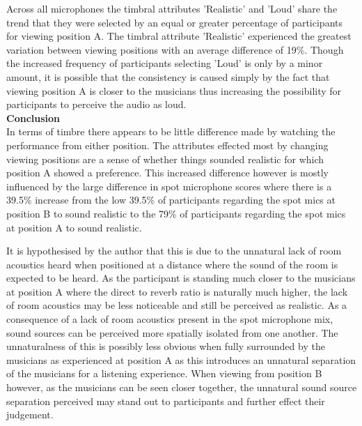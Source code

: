 
	Across all microphones the timbral attributes 'Realistic' and 'Loud' share the trend that they were selected by an equal or greater percentage of participants for viewing position A. The timbral attribute 'Realistic' experienced the greatest variation between viewing positions with an average difference of 19\%. Though the increased frequency of participants selecting 'Loud' is only by a minor amount, it is possible that the consistency is caused simply by the fact that viewing position A is closer to the musicians thus increasing the possibility for participants to perceive the audio as loud. \\


	\textbf{Conclusion} \\

		In terms of timbre there appears to be little difference made by watching the performance from either position. The attributes effected most by changing viewing positions are a sense of whether things sounded realistic for which position A showed a preference. This increased difference however is mostly influenced by the large difference in spot microphone scores where there is a 39.5\% increase from the low 39.5\% of participants regarding the spot mics at position B to sound realistic to the 79\% of participants regarding the spot mics at position A to sound realistic. 

		It is hypothesised by the author that this is due to the unnatural lack of room acoustics heard when positioned at a distance where the sound of the room is expected to be heard. As the participant is standing much closer to the musicians at position A where the direct to reverb ratio is naturally much higher, the lack of room acoustics may be less noticeable and still be perceived as realistic. As a consequence of a lack of room acoustics present in the spot microphone mix, sound sources can be perceived more spatially isolated from one another. The unnaturalness of this is possibly less obvious when fully surrounded by the musicians as experienced at position A as this introduces an unnatural separation of the musicians for a listening experience. When viewing from position B however, as the musicians can be seen closer together, the unnatural sound source separation perceived may stand out to participants and further effect their judgement. \\

